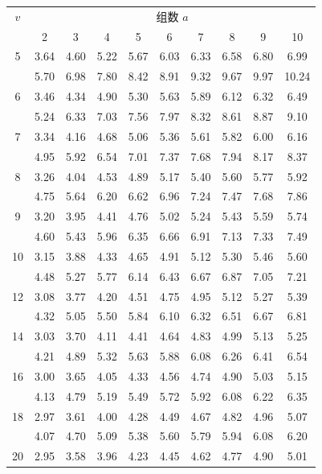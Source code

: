 \documentclass[lang=cn,10pt]{elegantbook}
\begin{document}
\begin{longtable}{c|ccccccccc}
    \hline
    $v$ & \multicolumn{9}{c}{组数 $a$} \\
    & 2 & 3 & 4 & 5 & 6 & 7 & 8 & 9 & 10 \\
    \hline
    \endhead
    5 & 3.64 & 4.60 & 5.22 & 5.67 & 6.03 & 6.33 & 6.58 & 6.80 & 6.99 \\
      & 5.70 & 6.98 & 7.80 & 8.42 & 8.91 & 9.32 & 9.67 & 9.97 & 10.24 \\
    6 & 3.46 & 4.34 & 4.90 & 5.30 & 5.63 & 5.89 & 6.12 & 6.32 & 6.49 \\
      & 5.24 & 6.33 & 7.03 & 7.56 & 7.97 & 8.32 & 8.61 & 8.87 & 9.10 \\
    7 & 3.34 & 4.16 & 4.68 & 5.06 & 5.36 & 5.61 & 5.82 & 6.00 & 6.16 \\
      & 4.95 & 5.92 & 6.54 & 7.01 & 7.37 & 7.68 & 7.94 & 8.17 & 8.37 \\
    8 & 3.26 & 4.04 & 4.53 & 4.89 & 5.17 & 5.40 & 5.60 & 5.77 & 5.92 \\
      & 4.75 & 5.64 & 6.20 & 6.62 & 6.96 & 7.24 & 7.47 & 7.68 & 7.86 \\
    9 & 3.20 & 3.95 & 4.41 & 4.76 & 5.02 & 5.24 & 5.43 & 5.59 & 5.74 \\
      & 4.60 & 5.43 & 5.96 & 6.35 & 6.66 & 6.91 & 7.13 & 7.33 & 7.49 \\
    10 & 3.15 & 3.88 & 4.33 & 4.65 & 4.91 & 5.12 & 5.30 & 5.46 & 5.60 \\
      & 4.48 & 5.27 & 5.77 & 6.14 & 6.43 & 6.67 & 6.87 & 7.05 & 7.21 \\
    12 & 3.08 & 3.77 & 4.20 & 4.51 & 4.75 & 4.95 & 5.12 & 5.27 & 5.39 \\
      & 4.32 & 5.05 & 5.50 & 5.84 & 6.10 & 6.32 & 6.51 & 6.67 & 6.81 \\
    14 & 3.03 & 3.70 & 4.11 & 4.41 & 4.64 & 4.83 & 4.99 & 5.13 & 5.25 \\
      & 4.21 & 4.89 & 5.32 & 5.63 & 5.88 & 6.08 & 6.26 & 6.41 & 6.54 \\
    16 & 3.00 & 3.65 & 4.05 & 4.33 & 4.56 & 4.74 & 4.90 & 5.03 & 5.15 \\
      & 4.13 & 4.79 & 5.19 & 5.49 & 5.72 & 5.92 & 6.08 & 6.22 & 6.35 \\
    18 & 2.97 & 3.61 & 4.00 & 4.28 & 4.49 & 4.67 & 4.82 & 4.96 & 5.07 \\
      & 4.07 & 4.70 & 5.09 & 5.38 & 5.60 & 5.79 & 5.94 & 6.08 & 6.20 \\
    20 & 2.95 & 3.58 & 3.96 & 4.23 & 4.45 & 4.62 & 4.77 & 4.90 & 5.01 \\

\end{longtable}
\end{document}
